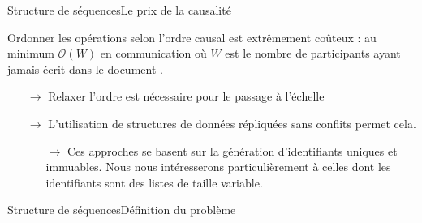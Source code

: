 





%     


\begin{frame}{Structure de séquences}{Le prix de la causalité}
  
  Ordonner les opérations selon l'ordre causal est extrêmement coûteux : au
  minimum $\mathcal{O}(W)$ en communication où $W$ est le nombre de participants
  ayant jamais écrit dans le document \REF.
  \begin{itemize}
  \item[$\rightarrow$] Relaxer l'ordre est nécessaire pour le passage à l'échelle
  \end{itemize}
  
  \vspace{0.5cm}
  
  \large
  \begin{itemize}
  \item [$\rightarrow$] L'utilisation de structures de données répliquées sans
    conflits \REF permet cela.
    \begin{itemize}
    \item [$\rightarrow$] Ces approches se basent sur la génération
      d'identifiants uniques et immuables. Nous nous intéresserons
      particulièrement à celles dont les identifiants sont des listes de taille
      variable.
    \end{itemize}
  \end{itemize}

\end{frame}

\begin{frame}{Structure de séquences}{Définition du problème}

\end{frame}

